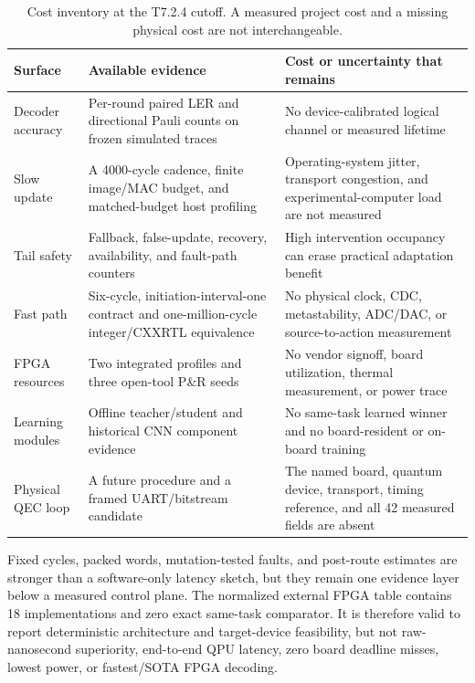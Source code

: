 \documentclass[11pt]{article}
\begin{document}
\begin{table}[htbp]
\centering
\small
\caption{Cost inventory at the T7.2.4 cutoff.  A measured project cost and a
missing physical cost are not interchangeable.}
\label{tab:discussion-costs}
\begin{tabularx}{\textwidth}{@{}L{0.23\textwidth} L{0.32\textwidth} Y@{}}
\toprule
Surface & Available evidence & Cost or uncertainty that remains \\
\midrule
Decoder accuracy & Per-round paired LER and directional Pauli counts on frozen simulated traces & No device-calibrated logical channel or measured lifetime \\
Slow update & A 4000-cycle cadence, finite image/MAC budget, and matched-budget host profiling & Operating-system jitter, transport congestion, and experimental-computer load are not measured \\
Tail safety & Fallback, false-update, recovery, availability, and fault-path counters & High intervention occupancy can erase practical adaptation benefit \\
Fast path & Six-cycle, initiation-interval-one contract and one-million-cycle integer/CXXRTL equivalence & No physical clock, CDC, metastability, ADC/DAC, or source-to-action measurement \\
FPGA resources & Two integrated profiles and three open-tool P\&R seeds & No vendor signoff, board utilization, thermal measurement, or power trace \\
Learning modules & Offline teacher/student and historical CNN component evidence & No same-task learned winner and no board-resident or on-board training \\
Physical QEC loop & A future procedure and a framed UART/bitstream candidate & The named board, quantum device, transport, timing reference, and all 42 measured fields are absent \\
\bottomrule
\end{tabularx}
\end{table}

Fixed cycles, packed words, mutation-tested faults, and post-route estimates are
stronger than a software-only latency sketch, but they remain one evidence layer
below a measured control plane.  The normalized external FPGA table contains
18 implementations and zero exact same-task comparator.  It is therefore
valid to report deterministic architecture and target-device feasibility, but
not raw-nanosecond superiority, end-to-end QPU latency, zero board deadline
misses, lowest power, or fastest/SOTA FPGA decoding.
\end{document}
